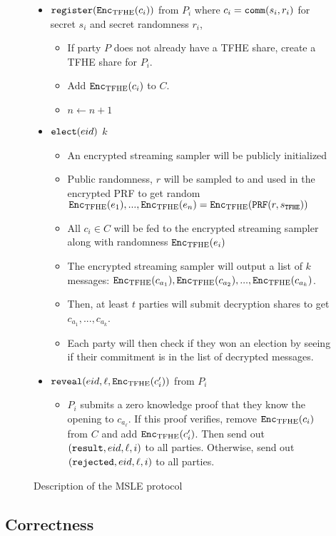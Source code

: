\begin{figure}[ht]
{\begin{minipage}{1\textwidth}
\begin{itemize}
				\item $\texttt{register}(\texttt{Enc}_{\mathrm{TFHE}}(c_i))$ from $P_i$ where $c_i = \texttt{comm}(s_i, r_i)$ for secret $s_i$ and secret randomness $r_i$,
				\begin{itemize}
					\item If party $P$ does not already have a TFHE share, create a TFHE share for $P_i$.
					\item Add $\texttt{Enc}_{\mathrm{TFHE}}(c_i)$ to $C$.
					\item $n \gets n + 1$
				\end{itemize}
				\item $\texttt{elect}({eid})$ $k$  
					\begin{itemize}
						\item An encrypted streaming sampler will be publicly initialized
						\item Public randomness, $r$ will be sampled to and used in the encrypted PRF to get random $\texttt{Enc}_{\mathrm{TFHE}}(e_1), ..., \texttt{Enc}_{\mathrm{TFHE}}(e_n)= \texttt{Enc}_{\mathrm{TFHE}}(\texttt{PRF}(r, s_\texttt{TFHE}))$
						\item All $c_i \in C$ will be fed to the encrypted streaming sampler along with randomness $\texttt{Enc}_{\mathrm{TFHE}}(e_i)$ 
						\item The encrypted streaming sampler will output a list of $k$ messages: $\texttt{Enc}_{\mathrm{TFHE}}(c_{a_1}), \texttt{Enc}_{\mathrm{TFHE}}(c_{a_2}), ..., \texttt{Enc}_{\mathrm{TFHE}}(c_{a_k})$.
						\item Then, at least $t$ parties will submit decryption shares to get $c_{a_1}, ..., c_{a_k}$.
						\item Each party will then check if they won an election by seeing if their commitment is in the list of decrypted messages.
					\end{itemize}
				\item $\texttt{reveal}({eid}, \ell, \texttt{Enc}_{\mathrm{TFHE}}(c'_i))$ from $P_i$
					\begin{itemize}
						\item $P_i$ submits a zero knowledge proof that they know the opening to $c_{a_\ell}$. If this proof verifies,
						remove $\texttt{Enc}_{\mathrm{TFHE}}(c_i)$ from $C$ and add $\texttt{Enc}_{\mathrm{TFHE}}(c'_i)$. Then send out $(\texttt{result}, {eid}, \ell, i)$ to all parties.
						Otherwise, send out $(\texttt{rejected}, {eid}, \ell, i)$ to all parties.
					\end{itemize}
			\end{itemize}
		\end{minipage}
	}
	\caption{Description of the MSLE protocol}
	\label{fig:protocolMSLE}
\end{figure}

\subsection{Correctness}

